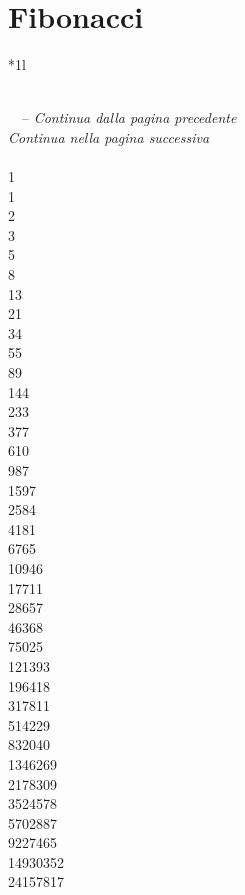  
\chapter{Fibonacci}
\begin{longtable}{*{1}{l}}\toprule
\caption{Numeri di Fibonacci}\\
\midrule
\endfirsthead
{} {\tablename\ \thetable\ -- \textit{Continua dalla pagina precedente}} \\
\toprule
\endhead
\bottomrule
{} {\textit{Continua nella pagina successiva}} \\
\endfoot
{}\\
1\\
1\\
2\\
3\\
5\\
8\\
13\\
21\\
34\\
55\\
89\\
144\\
233\\
377\\
610\\
987\\
1597\\
2584\\
4181\\
6765\\
10946\\
17711\\
28657\\
46368\\
75025\\
121393\\
196418\\
317811\\
514229\\
832040\\
1346269\\
2178309\\
3524578\\
5702887\\
9227465\\
14930352\\
24157817\\

\end{longtable}
